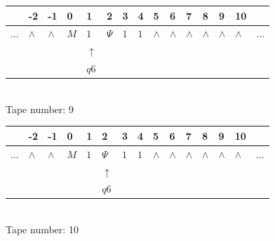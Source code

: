 \documentclass[11pt]{article}
\begin{document}
\begin{table}[H]
\centering
\begin{tabular}{lllllllllllllll}
 & -2 & -1 & 0 & 1 & 2 & 3 & 4 & 5 & 6 & 7 & 8 & 9 & 10 & \\
\hline
$...$ & \multicolumn{1}{|l|}{$\wedge$} & \multicolumn{1}{|l|}{$\wedge$} & \multicolumn{1}{|l|}{$M$} & \multicolumn{1}{|l|}{$1$} & \multicolumn{1}{|l|}{$\Psi$} & \multicolumn{1}{|l|}{$1$} & \multicolumn{1}{|l|}{$1$} & \multicolumn{1}{|l|}{$\wedge$} & \multicolumn{1}{|l|}{$\wedge$} & \multicolumn{1}{|l|}{$\wedge$} & \multicolumn{1}{|l|}{$\wedge$} & \multicolumn{1}{|l|}{$\wedge$} & \multicolumn{1}{|l|}{$\wedge$} & $...$\\
\hline
&  &  &  & $\uparrow$ &  &  &  &  &  &  &  &  &  &  \\
&  &  &  & $ q6 $ &  &  &  &  &  &  &  &  &  &  \\
\end{tabular}
\\
Tape number: 9
\noindent\makebox[\linewidth]{\hdashrule{\textwidth}{1pt}{1pt}}\end{table}

\begin{table}[H]
\centering
\begin{tabular}{lllllllllllllll}
 & -2 & -1 & 0 & 1 & 2 & 3 & 4 & 5 & 6 & 7 & 8 & 9 & 10 & \\
\hline
$...$ & \multicolumn{1}{|l|}{$\wedge$} & \multicolumn{1}{|l|}{$\wedge$} & \multicolumn{1}{|l|}{$M$} & \multicolumn{1}{|l|}{$1$} & \multicolumn{1}{|l|}{$\Psi$} & \multicolumn{1}{|l|}{$1$} & \multicolumn{1}{|l|}{$1$} & \multicolumn{1}{|l|}{$\wedge$} & \multicolumn{1}{|l|}{$\wedge$} & \multicolumn{1}{|l|}{$\wedge$} & \multicolumn{1}{|l|}{$\wedge$} & \multicolumn{1}{|l|}{$\wedge$} & \multicolumn{1}{|l|}{$\wedge$} & $...$\\
\hline
&  &  &  &  & $\uparrow$ &  &  &  &  &  &  &  &  &  \\
&  &  &  &  & $ q6 $ &  &  &  &  &  &  &  &  &  \\
\end{tabular}
\\
Tape number: 10
\noindent\makebox[\linewidth]{\hdashrule{\textwidth}{1pt}{1pt}}\end{table}
\end{document}

